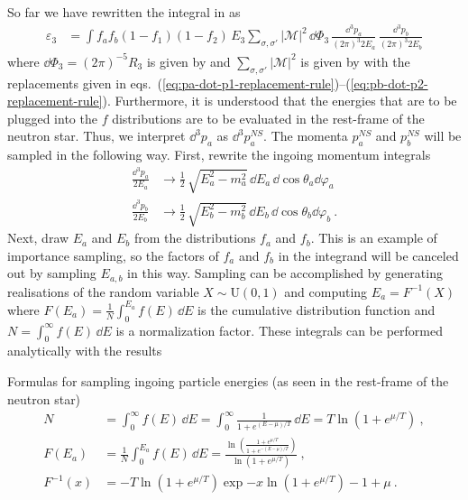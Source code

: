 \label{subsec:event-generation}
So far we have rewritten the integral in  as 
\begin{align}
    \varepsilon_{3} &= \int f_a f_b (1 - f_1)(1 - f_2) 
                    \, E_3 \sum_{\sigma,\sigma'} |\mathcal{M}|^2 
                    \, \dd \Phi_3 
                    \, \frac{\dd^3 p_a}{(2\pi)^3 2 E_a}
                    \, \frac{\dd^3 p_b}{(2\pi)^3 2 E_b}
\end{align}
where $\dd \Phi_3 = (2\pi)^{-5} R_3$ is given by  and $\sum_{\sigma, \sigma'} |\mathcal{M}|^2$ is given by  with the replacements given in eqs.~(\ref{eq:pa-dot-p1-replacement-rule})--(\ref{eq:pb-dot-p2-replacement-rule}).
Furthermore, it is understood that the energies that are to be plugged into the $f$ distributions are to be evaluated in the rest-frame of the neutron star. 
Thus, we interpret $\dd^3 p_a$ as $\dd^3 p_a^{NS}$.  
The momenta $p_a^{NS}$ and $p_b^{NS}$ will be sampled in the following way. 
First, rewrite the ingoing momentum integrals
\begin{align}
    \frac{\dd^3 p_a}{2 E_a} &\rightarrow \frac{1}{2}\,\sqrt{E_a^2 - m_a^2} \, \dd E_a \, \dd \cos \theta_a \dd \varphi_a \\
    \frac{\dd^3 p_b}{2 E_b} &\rightarrow \frac{1}{2}\,\sqrt{E_b^2 - m_b^2} \, \dd E_b \, \dd \cos \theta_b \dd \varphi_b\ .
\end{align}
Next, draw $E_a$ and $E_b$ from the distributions $f_a$ and $f_b$. 
This is an example of importance sampling, so the factors of $f_a$ and $f_b$ in the integrand will be canceled out by sampling $E_{a,b}$ in this way.
Sampling can be accomplished by generating realisations of the random variable $X \sim \mathrm{U}(0,1)$ and computing $E_a = F^{-1}(X)$ where $F(E_a) = \frac{1}{N}\int_0^{E_a} f(E) \, \dd E$ is the cumulative distribution function and $N = \int_0^\infty f(E) \, \dd E$ is a normalization factor. 
These integrals can be performed analytically with the results
\begin{bluenv}{Formulas for sampling ingoing particle energies (as seen in the rest-frame of the neutron star)}
    \vspace{-2ex}
    \begin{align}
        N &= \int_0^\infty f(E) \, \dd E = \int_0^\infty \frac{1}{1 + e^{(E-\mu)/T}} \, \dd E = T \ln(1 + e^{\mu / T}) \ , \\
        F(E_a) &= \frac{1}{N} \int_0^{E_a} f(E) \, \dd E = \frac{\ln ( \frac{1 + e^{\mu/T}}{1 + e^{-(E-\mu)/T}})}{\ln(1 + e^{\mu / T})} \ , \\
        F^{-1}(x) &= -T \ln(1 + e^{\mu/T}) \exp{-x \ln(1 + e^{\mu/T}) - 1} + \mu \ .
    \end{align}
\end{bluenv}
